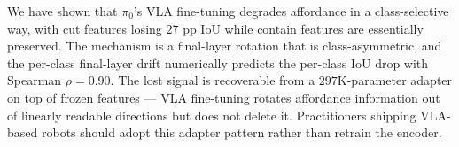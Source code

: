\documentclass[10pt]{article}
\begin{document}
We have shown that $\pi_0$'s VLA fine-tuning degrades affordance in a
class-selective way, with cut features losing $27$ pp IoU while contain
features are essentially preserved. The mechanism is a final-layer rotation
that is class-asymmetric, and the per-class final-layer drift numerically
predicts the per-class IoU drop with Spearman $\rho = 0.90$. The lost
signal is recoverable from a $297$K-parameter adapter on top of frozen
features — VLA fine-tuning rotates affordance information out of linearly
readable directions but does not delete it. Practitioners shipping VLA-based
robots should adopt this adapter pattern rather than retrain the encoder.



\end{document}
